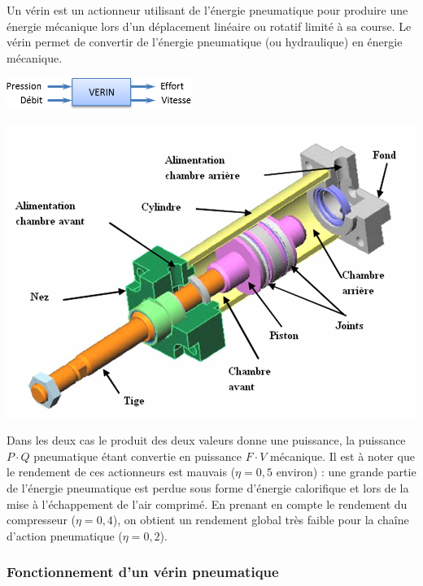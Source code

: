 \documentclass[10pt]{article}
\begin{document}
\begin{minipage}[c]{.47\textwidth}
Un vérin est un actionneur utilisant de l'énergie pneumatique pour produire une énergie mécanique lors d'un déplacement linéaire ou rotatif limité à sa course. Le vérin permet de convertir de l'énergie pneumatique (ou hydraulique) en énergie mécanique.

\begin{center}
\includegraphics[width=6cm]{images/fig1}
\end{center}
\end{minipage} \hfill
\begin{minipage}[c]{.5\textwidth}
\begin{center}
\includegraphics[width=\textwidth]{images/Fig_03_Verin}
\end{center}
\end{minipage}

Dans les deux cas le produit des deux valeurs donne une puissance, la puissance $P\cdot Q$ pneumatique étant convertie en puissance $F\cdot V$ mécanique. Il est à noter que le rendement de ces actionneurs est mauvais ($\eta =0,5$ environ) : une grande partie de l'énergie pneumatique est perdue sous forme d'énergie calorifique et lors de la mise à l'échappement de l'air comprimé. En prenant en compte le rendement du compresseur ($\eta =0,4$), on obtient un rendement global très faible pour la chaîne d'action pneumatique ($\eta =0,2$).

\subsubsection{Fonctionnement d'un vérin pneumatique}
\end{document}
